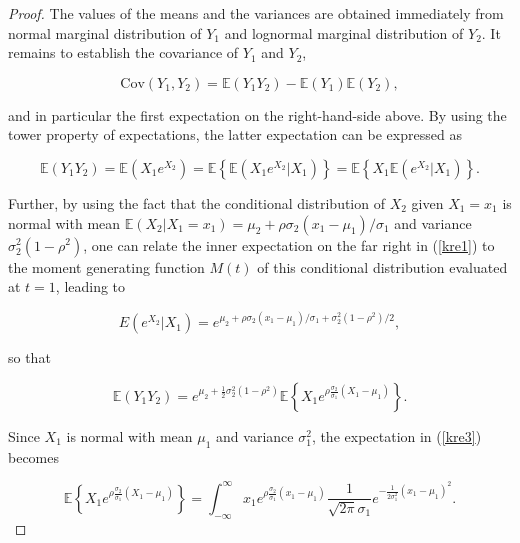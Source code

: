 \documentclass[
]{jss}
\begin{document}
\begin{proof}
The values of the means and the variances are obtained immediately from normal marginal distribution of $Y_1$ and lognormal marginal distribution of $Y_2$. It remains to establish the covariance of $Y_1$ and $Y_2$, 

\begin{equation}
\mbox{Cov}(Y_1, Y_2) = \mathbb E(Y_1 Y_2) - \mathbb E(Y_1)\mathbb E(Y_2), 
\label{eq:covy1y2}
\end{equation}

and in particular the first expectation on the right-hand-side above. By using the tower property of expectations, the latter expectation can be expressed as 

\begin{equation}
\mathbb E(Y_1 Y_2)  =  \mathbb E\left(X_1 e^{X_2}\right)  =  \mathbb E \left\{ \mathbb E \left(X_1 e^{X_2} | X_1 \right) \right\} = \mathbb E \left\{ X_1 \mathbb E \left(e^{X_2} | X_1 \right) \right\}.
\label{eq:kre1}
\end{equation}

Further, by using the fact that the conditional distribution of $X_2$ given $X_1=x_1$ is normal with mean $\mathbb E(X_2|X_1=x_1) = \mu_2+\rho\sigma_2(x_1-\mu_1)/\sigma_1$ and variance $\sigma_2^2(1-\rho^2)$, one can relate the inner expectation on the far right in (\ref{kre1}) to the moment generating function $M(t)$ of this conditional distribution evaluated at $t=1$, leading to 

\begin{equation}
E \left(e^{X_2} | X_1 \right) = e^{ \mu_2+\rho\sigma_2(x_1-\mu_1)/\sigma_1 + \sigma_2^2(1-\rho^2)/2},
\label{eq:kre2}
\end{equation}

so that 

\begin{equation}
\mathbb E(Y_1 Y_2)  =  e^{ \mu_2+ \frac{1}{2} \sigma_2^2(1-\rho^2)} \mathbb E \left\{ X_1 e^{ \rho\frac{\sigma_2}{\sigma_1} (X_1-\mu_1)} \right\}.
\label{eq:kre3}
\end{equation}

Since $X_1$ is normal with mean $\mu_1$ and variance $\sigma_1^2$, the expectation in (\ref{kre3}) becomes 

\begin{equation}
\mathbb E \left\{ X_1 e^{ \rho\frac{\sigma_2}{\sigma_1} (X_1-\mu_1)} \right\} = \int_{-\infty}^\infty x_1 e^{ \rho\frac{\sigma_2}{\sigma_1} (x_1-\mu_1)} \frac{1}{\sqrt{2\pi}\sigma_1} e^{-\frac{1}{2\sigma_1^2}(x_1-\mu_1)^2}.
\label{eq:kre4}
\end{equation}


\end{proof}
\end{document}
